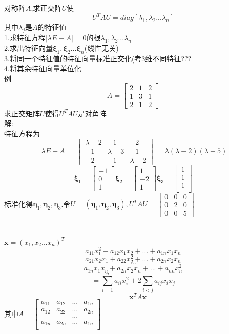 \documentclass[11pt, a4paper, UTF8]{ctexart}
\begin{document}
\subsection{}
对称阵$A$,求正交阵$U$使
\[U^TAU=diag[\lambda_1,\lambda_2...\lambda_n]\]
其中$\lambda_j$是$A$的特征值\\
1.求特征方程$|\lambda E-A|=0$的根$\lambda_1,\lambda_2...\lambda_n$\\
2.求出特征向量$\bm\xi_1,\bm\xi_2...\bm\xi_n$(线性无关)\\
3.将同一个特征值的特征向量标准正交化(考3维不同特征???\\
4.将其余特征向量单位化\\
例\\
\[A=\begin{bmatrix}
2&1&2\\
1&3&1\\
2&1&2
\end{bmatrix}\]
求正交矩阵$U$使得$U^TAU$是对角阵\\
解:\\
特征方程为
\[|\lambda E-A|=\begin{vmatrix}
\lambda-2&-1&-2\\
-1&\lambda-3&-1\\
-2&-1&\lambda-2
\end{vmatrix}=\lambda(\lambda-2)(\lambda-5)\]
\[\bm\xi_1=\begin{bmatrix}
-1\\
0\\
1
\end{bmatrix}\bm\xi_2=\begin{bmatrix}
1\\
-2\\
1
\end{bmatrix}\bm\xi_3=\begin{bmatrix}
1\\
1\\
1\\
\end{bmatrix}\]
标准化得$\bm\eta_1,\bm\eta_2,\bm\eta_3$.令$U=(\bm\eta_1,\bm\eta_2,\bm\eta_3),U^TAU=\begin{bmatrix}
0&0&0\\
0&2&0\\
0&0&5
\end{bmatrix}$
\section{}
$\bm x=(x_1,x_2...x_n)^T$\\
\[a_{11}x_1^2+a_{12}x_1x_2+...+a_{1n}x_1x_n\]
\[a_{21}x_2x_1+a_{22}x_2^2+...+a_{2n}x_2x_n\]
\[...\]
\[a_{1n}x_1x_n+a_{2n}x_2x_n+...+a_{nn}x_n^2\]
\[=\sum_{i=1}^na_{ii}x_i^2+2\sum_{i<j}a_{ij}x_ix_j\]
\[=\bm x^TA\bm x\]
其中$A=\begin{bmatrix}
a_{11}&a_{12}&...&a_{1n}\\
a_{12}&a_{22}&...&a_{2n}\\
&&...&\\
a_{1n}&a_{2n}&...&a_{1n}\\
\end{bmatrix}$
\end{document}
